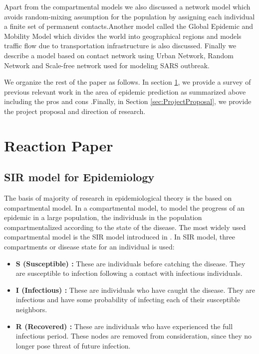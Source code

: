 \documentclass[12pt, journal,onecolumn]{IEEEtran}
\begin{document}
Apart from the compartmental models we also discussed a network model which avoids random-mixing assumption for the population by assigning each individual a finite set of permanent contacts.Another model called the Global Epidemic and Mobility Model which divides the world into geographical regions and models traffic flow due to transportation 
infrastructure is also discussed. Finally  we describe a model based on contact network using Urban Network, Random Network and Scale-free network used for modeling SARS outbreak.



We organize the rest of the paper as follows. In section \ref{sec:ReactionPaper}, we provide a survey of previous relevant work in the area of epidemic prediction as summarized above including the pros and cons .Finally, in Section \ref{sec:ProjectProposal}, we provide the project proposal and direction of research.

\section{Reaction Paper}
\label{sec:ReactionPaper}
\subsection{\textbf{SIR model for Epidemiology  \citep{very_old_paper}}}
\label{SubSec:SIR}
The basis of majority of research in epidemiological theory is the based on compartmental model. In a compartmental model, to model the progress of an epidemic in a large population, the individuals in the population compartmentalized according to the state of the disease. The most widely used compartmental model is the SIR model introduced in \citep{very_old_paper}. In SIR model, three compartments or disease state for an individual is used:

\begin{itemize}
\item \textbf{S (Susceptible) : } These are individuals before catching the disease. They are susceptible to infection following a contact with infectious individuals.
\item \textbf{I (Infectious) : }These are individuals who have caught the disease. They are infectious and have some probability of infecting each of their susceptible neighbors.
\item \textbf{R (Recovered) : }These are individuals who have experienced the full infectious period. These nodes are removed from consideration, since they no longer pose threat of future infection.
\end{itemize}
\end{document}

